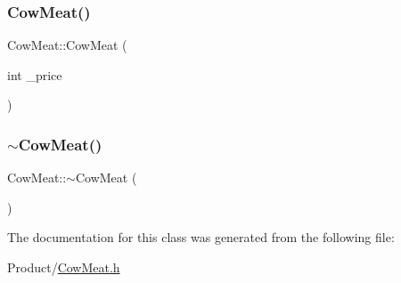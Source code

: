 \mbox{\label{classCowMeat_a290a564c35f51f63d461f5c8a5253419}} 
\subsubsection{\texorpdfstring{CowMeat()}{CowMeat()}\hspace{0.1cm}{\footnotesize\ttfamily [2/2]}}
{\footnotesize\ttfamily Cow\+Meat\+::\+Cow\+Meat (\begin{DoxyParamCaption}\item[{int}]{\+\_\+price }\end{DoxyParamCaption})}

\mbox{\label{classCowMeat_a4d2904e1fe04f3f5d91d484f512b4716}} 
\subsubsection{\texorpdfstring{$\sim$CowMeat()}{~CowMeat()}}
{\footnotesize\ttfamily Cow\+Meat\+::$\sim$\+Cow\+Meat (\begin{DoxyParamCaption}{ }\end{DoxyParamCaption})}



The documentation for this class was generated from the following file\+:\begin{DoxyCompactItemize}
\item 
Product/\mbox{\hyperlink{CowMeat_8h}{Cow\+Meat.\+h}}\end{DoxyCompactItemize}
